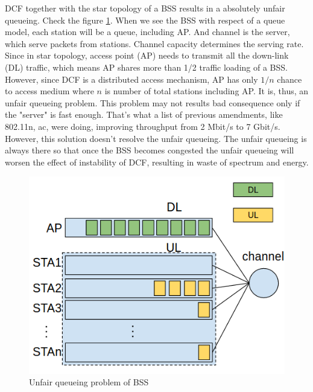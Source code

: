 DCF together with the star topology of a BSS results in a absolutely unfair queueing. 
Check the figure \ref{fig_unfair_queueing}.
When we see the BSS with respect of a queue model, each station will be a queue, including AP.
And channel is the server, which serve packets from stations. Channel capacity determines the serving rate.
Since in star topology, access point (AP) needs to transmit all the down-link (DL) traffic, which means AP shares more than 1/2 traffic loading of a BSS. 
However, since DCF is a distributed access mechanism, AP has only $1/n$ chance to access medium where $n$ is number of total stations including AP. It is, thus, an unfair queueing problem. 
This problem may not results bad consequence only if the "server" is fast enough. 
That's what a list of previous amendments, like 802.11n, ac, were doing, improving throughput from 2 Mbit/s to 7 Gbit/s. 
However, this solution doesn't resolve the unfair queueing. 
The unfair queueing is always there so that once the BSS becomes congested the unfair queueing will worsen the effect of instability of DCF, resulting in waste of spectrum and energy.
\begin{figure}[!h]
\centering
\includegraphics[scale=0.5]{./figure/chp1/unfair_queueing.png}
\caption{Unfair queueing problem of BSS}
\label{fig_unfair_queueing}
\end{figure}

